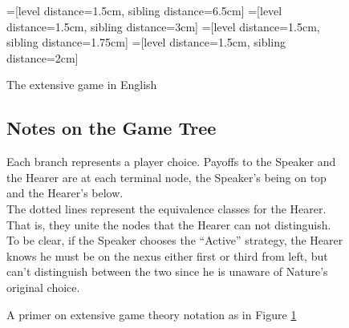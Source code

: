 \documentclass{article}
\begin{document}
\begin{figure}
\begin{center}
=[level distance=1.5cm, sibling distance=6.5cm]
=[level distance=1.5cm, sibling distance=3cm]
=[level distance=1.5cm, sibling distance=1.75cm]
=[level distance=1.5cm, sibling distance=2cm]
\end{center}
\caption{The extensive game\label{exten} in English}
\end{figure}

\begin{figure}
	\begin{shaded}
		\small
		\subsection*{Notes on the Game Tree}
Each branch represents a player choice. Payoffs to the Speaker and the Hearer are at each terminal node, the Speaker's being on top and the Hearer's below.\\

The dotted lines represent the equivalence classes for the Hearer. That is, they unite the nodes that the Hearer can not distinguish. To be clear, if the Speaker chooses the ``Active'' strategy, the Hearer knows he must be on the nexus either first or third from left, but can't distinguish between the two since he is unaware of Nature's original choice.
	\caption{A primer on extensive game theory notation as in Figure \ref{exten}\label{expl}}
	\end{shaded}
\end{figure}
\end{document}
